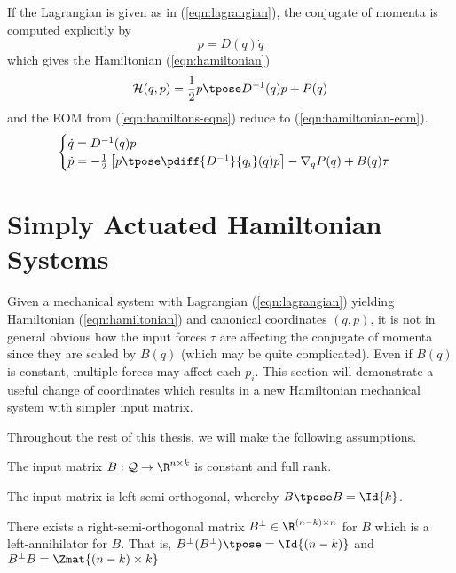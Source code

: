 If the Lagrangian is given as in (\ref{eqn:lagrangian}), the conjugate of
momenta is computed explicitly by
\[
    p = D(q)\dot{q}
\]
which gives the Hamiltonian (\ref{eqn:hamiltonian})
\begin{equation}\label{eqn:hamiltonian}
    \mathcal{H}(q,p) = \frac{1}{2} p\tpose D^{-1}(q) p + P(q)
\end{equation}
and the EOM from (\ref{eqn:hamiltons-eqns}) reduce to 
(\ref{eqn:hamiltonian-eom}).
\begin{equation}\label{eqn:hamiltonian-eom}
    \begin{cases}
        \dot{q} = D^{-1}(q)p \\
        \dot{p} = -\frac{1}{2} \left[p\tpose \pdiff{D^{-1}}{q_i}(q) p\right] 
        - \nabla_q P(q) + B(q) \tau \\
    \end{cases}
\end{equation}

\section{Simply Actuated Hamiltonian Systems}
Given a mechanical system with Lagrangian (\ref{eqn:lagrangian}) yielding 
Hamiltonian (\ref{eqn:hamiltonian}) and canonical coordinates \((q,p)\), 
it is not in general obvious how the input forces
\(\tau\) are affecting the conjugate of momenta since they are scaled by
\(B(q)\) (which may be quite complicated). Even if \(B(q)\) is constant, multiple
forces may affect each \(p_i\). This section will demonstrate a useful change of
coordinates which results in a new Hamiltonian mechanical system with simpler
input matrix.

Throughout the rest of this thesis, we will make the following assumptions.
\begin{assm}\label{assm:B-const}
    The input matrix \(B : \mathcal{Q} \rightarrow \R^{n\times k}\) is constant
    and full rank.
\end{assm}
\begin{assm}\label{assm:B-orthogonal}
    The input matrix is left-semi-orthogonal, whereby \(B\tpose B = \Id{k}\).
\end{assm}
\begin{assm}\label{assm:B-perp}
    There exists a right-semi-orthogonal matrix 
    \(B^\perp \in \R^{(n-k)\times n}\) for \(B\)
    which is a left-annihilator for \(B\). That is,
    \(B^\perp(B^\perp)\tpose = \Id{(n-k)}\) and
    \(B^\perp B = \Zmat{(n-k) \times k}\) 
\end{assm}

